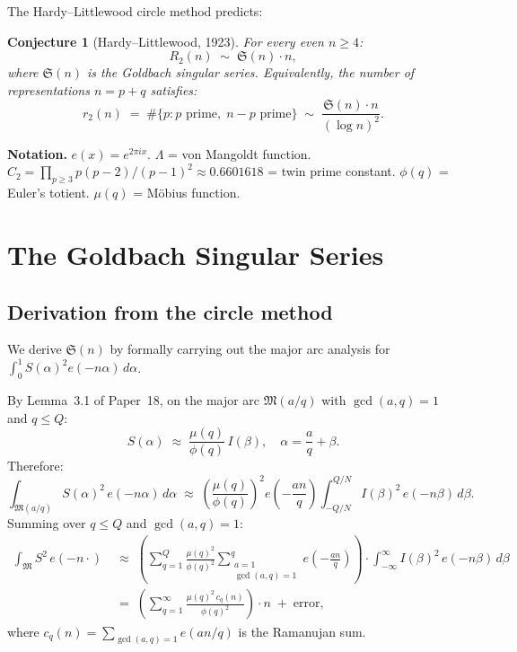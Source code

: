 \documentclass[12pt,a4paper]{amsart}
\newtheorem{conjecture}[theorem]{Conjecture}
\theoremstyle{definition}
\newcommand{\eq}[1]{e\!\left(#1\right)}
\begin{document}
The Hardy--Littlewood circle method predicts:

\begin{conjecture}[Hardy--Littlewood, 1923]\label{conj:HL}
  For every even $n \geq 4$:
  \[
    R_2(n) \;\sim\; \mathfrak{S}(n) \cdot n,
  \]
  where $\mathfrak{S}(n)$ is the Goldbach singular series.  Equivalently,
  the number of representations $n = p + q$ satisfies:
  \[
    r_2(n) \;=\; \#\{p : p \text{ prime},\; n-p \text{ prime}\}
    \;\sim\; \frac{\mathfrak{S}(n) \cdot n}{(\log n)^2}.
  \]
\end{conjecture}

\textbf{Notation.}  $\eq{x} = e^{2\pi ix}$.  $\Lambda$ = von Mangoldt function.
$C_2 = \prod_{p \geq 3} p(p-2)/(p-1)^2 \approx 0.6601618$ = twin prime constant.
$\phi(q)$ = Euler's totient.  $\mu(q)$ = M\"obius function.

\section{The Goldbach Singular Series}
\label{sec:singular}

\subsection{Derivation from the circle method}

We derive $\mathfrak{S}(n)$ by formally carrying out the major arc
analysis for $\int_0^1 S(\alpha)^2 \eq{-n\alpha}\, d\alpha$.

By Lemma~3.1 of Paper~18, on the major arc $\mathfrak{M}(a/q)$ with
$\gcd(a,q)=1$ and $q \leq Q$:
\[
  S(\alpha) \;\approx\; \frac{\mu(q)}{\phi(q)}\, I(\beta),
  \quad \alpha = \frac{a}{q} + \beta.
\]
Therefore:
\[
  \int_{\mathfrak{M}(a/q)} S(\alpha)^2\, \eq{-n\alpha}\, d\alpha
  \;\approx\; \left(\frac{\mu(q)}{\phi(q)}\right)^2 \eq{-\frac{an}{q}}
               \int_{-Q/N}^{Q/N} I(\beta)^2\, \eq{-n\beta}\, d\beta.
\]
Summing over $q \leq Q$ and $\gcd(a,q)=1$:
\begin{align*}
  \int_{\mathfrak{M}} S^2\, \eq{-n\cdot}
  &\;\approx\; \left(\sum_{q=1}^{Q} \frac{\mu(q)^2}{\phi(q)^2}
                \sum_{\substack{a=1\\ \gcd(a,q)=1}}^{q} \eq{-\frac{an}{q}}\right)
               \cdot \int_{-\infty}^{\infty} I(\beta)^2\, \eq{-n\beta}\, d\beta \\
  &\;=\; \left(\sum_{q=1}^{\infty} \frac{\mu(q)^2\, c_q(n)}{\phi(q)^2}\right)
          \cdot n \;+\; \text{error},
\end{align*}
where $c_q(n) = \sum_{\gcd(a,q)=1} \eq{an/q}$ is the Ramanujan sum.
\end{document}
